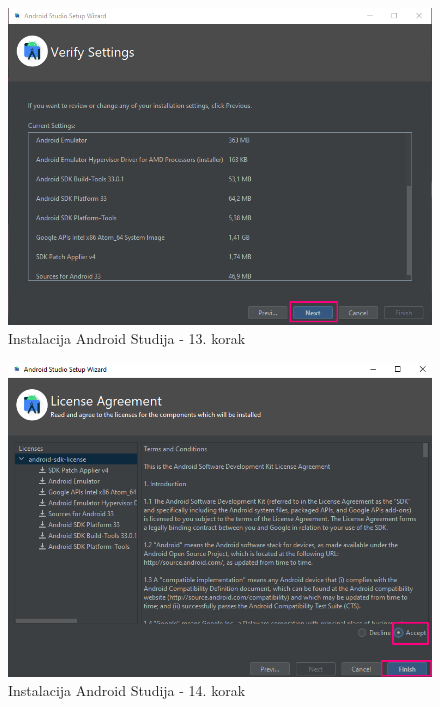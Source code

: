 \documentclass[11pt,a4paper,twoside]{article}
\begin{document}
\begin{figure}[!h]
	\centering
	\includegraphics[width=\textwidth]{install_13.png}
	\caption{Instalacija Android Studija - 13. korak}
	\label{fig:install_13}	
\end{figure}

\begin{figure}[!h]
	\centering
	\includegraphics[width=\textwidth]{install_14.png}
	\caption{Instalacija Android Studija - 14. korak}
	\label{fig:install_14}	
\end{figure}
\end{document}
